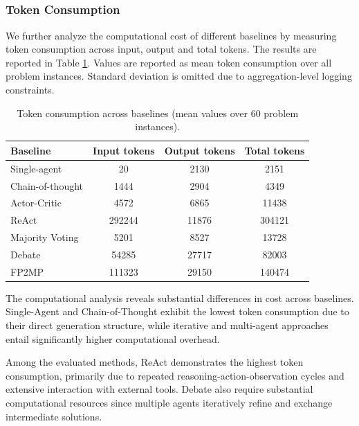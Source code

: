 \subsection{}

\subsubsection{Token Consumption}

We further analyze the computational cost of different baselines by measuring token consumption across input, output and total tokens. The results are reported in Table \ref{table:token_consumption}. Values are reported as mean token consumption over all problem instances. Standard deviation is omitted due to aggregation-level logging constraints.

\begin{table}[h]
\centering
\small
\begin{tabular}{lccc}
\hline
\textbf{Baseline} & \textbf{Input tokens} & \textbf{Output tokens} & \textbf{Total tokens} \\
\hline
Single-agent & 20 & 2130 & 2151 \\
Chain-of-thought & 1444 & 2904 & 4349 \\
Actor-Critic & 4572 & 6865 & 11438 \\
ReAct & 292244 & 11876 & 304121 \\
Majority Voting & 5201 & 8527 & 13728 \\
Debate & 54285 & 27717 & 82003 \\
FP2MP & 111323 & 29150 & 140474 \\
\hline
\end{tabular}
\caption{Token consumption across baselines (mean values over 60 problem instances).}
\label{table:token_consumption}
\end{table}

The computational analysis reveals substantial differences in cost across baselines.
Single-Agent and Chain-of-Thought exhibit the lowest token consumption due to their direct generation structure, while iterative and multi-agent approaches entail significantly higher computational overhead.

Among the evaluated methods, ReAct demonstrates the highest token consumption, primarily due to repeated reasoning-action-observation cycles and extensive interaction with external tools.
Debate also require substantial computational resources since multiple agents iteratively refine and exchange intermediate solutions.

